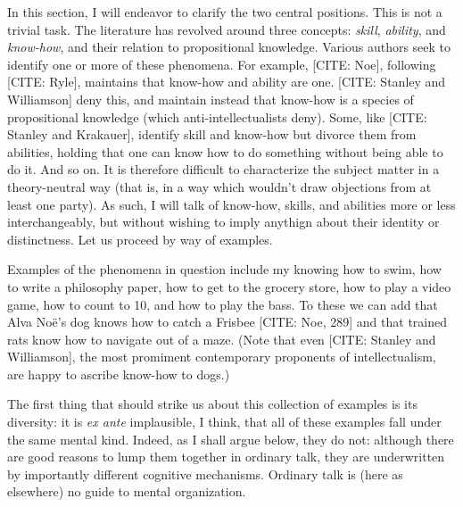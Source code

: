 In this section, I will endeavor to clarify the two central positions.
This is not a trivial task.
The literature has revolved around three concepts: \emph{skill}, \emph{ability}, and \emph{know-how}, and their relation to propositional knowledge.
Various authors seek to identify one or more of these phenomena.
For example, [CITE: Noe], following [CITE: Ryle], maintains that know-how and ability are one.
[CITE: Stanley and Williamson] deny this, and maintain instead that know-how is a species of propositional knowledge (which anti-intellectualists deny).
Some, like [CITE: Stanley and Krakauer], identify skill and know-how but divorce them from abilities, holding that one can know how to do something without being able to do it.
And so on.
It is therefore difficult to characterize the subject matter in a theory-neutral way (that is, in a way which wouldn't draw objections from at least one party).
As such, I will talk of know-how, skills, and abilities more or less interchangeably, but without wishing to imply anythign about their identity or distinctness. 
Let us proceed by way of examples.

Examples of the phenomena in question include my knowing how to swim, how to write a philosophy paper, how to get to the grocery store, how to play a video game, how to count to 10, and how to play the bass.
To these we can add that Alva No\"e's dog knows how to catch a Frisbee [CITE: Noe, 289] and that trained rats know how to navigate out of a maze.
(Note that even [CITE: Stanley and Williamson], the most promiment contemporary proponents of intellectualism, are happy to ascribe know-how to dogs.)

The first thing that should strike us about this collection of examples is its diversity: it is \emph{ex ante} implausible, I think, that all of these examples fall under the same mental kind.
Indeed, as I shall argue below, they do not: although there are good reasons to lump them together in ordinary talk, they are underwritten by importantly different cognitive mechanisms.
Ordinary talk is (here as elsewhere) no guide to mental organization.

